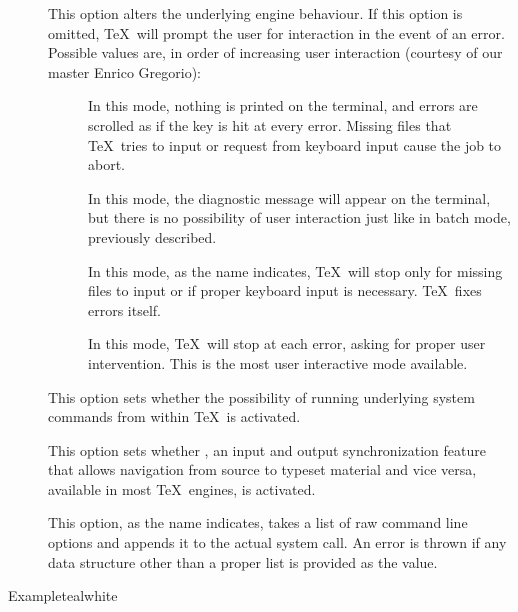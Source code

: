 \begin{description}
\begin{description}
\item[] This option alters the underlying engine behaviour. If this option is omitted, \TeX\ will prompt the user for interaction in the event of an error. Possible values are, in order of increasing user interaction (courtesy of our master Enrico Gregorio):

\begin{description}
\item[] In this mode, nothing is printed on the terminal, and errors are scrolled as if the  key is hit at every error. Missing files that \TeX\ tries to input or request from keyboard input cause the job to abort.

\item[] In this mode, the diagnostic message will appear on the terminal, but there is no possibility of user interaction just like in batch mode, previously described.

\item[] In this mode, as the name indicates, \TeX\ will stop only for missing files to input or if proper keyboard input is necessary. \TeX\ fixes errors itself.

\item[] In this mode, \TeX\ will stop at each error, asking for proper user intervention. This is the most user interactive mode available.
\end{description}

\item[] This option sets whether the possibility of running underlying system commands from within \TeX\ is activated.

\item[] This option sets whether , an input and output synchronization feature that allows navigation from source to typeset material and vice versa, available in most \TeX\ engines, is activated.

\item[] This option, as the name indicates, takes a list of raw command line options and appends it to the actual system call. An error is thrown if any data structure other than a proper list is provided as the value.
\end{description}

\begin{codebox}{Example}{teal}{\icnote}{white}
\end{codebox}


\end{description}
